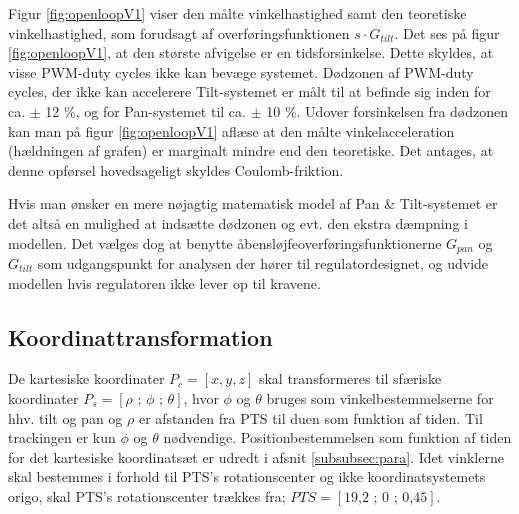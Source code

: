 Figur \ref{fig:openloopV1} viser den målte vinkelhastighed samt den teoretiske vinkelhastighed,
som forudsagt af overføringsfunktionen \(s\cdot{}G_{tilt}\).
Det ses på figur \ref{fig:openloopV1}, at den største afvigelse er en tidsforsinkelse.
Dette skyldes, at visse PWM-duty cycles ikke kan bevæge systemet.
Dødzonen af PWM-duty cycles, der ikke kan accelerere Tilt-systemet er målt til at befinde sig inden for
ca. \(\pm\) 12 \%, og for Pan-systemet til ca. \(\pm\) 10 \%.
Udover forsinkelsen fra dødzonen kan man på figur \ref{fig:openloopV1} aflæse
at den målte vinkelacceleration (hældningen af grafen) er marginalt mindre end den teoretiske.
Det antages, at denne opførsel hovedsageligt skyldes Coulomb-friktion.

Hvis man ønsker en mere nøjagtig matematisk model af Pan \& Tilt-systemet
er det altså en mulighed at indsætte dødzonen og evt. den ekstra dæmpning i modellen.
Det vælges dog at benytte åbensløjfeoverføringsfunktionerne \(G_{pan}\) og \(G_{tilt}\)
som udgangspunkt for analysen der hører til regulatordesignet,
og udvide modellen hvis regulatoren ikke lever op til kravene.

\subsection{Koordinattransformation}
\label{sec:koordinattransformation}
De kartesiske koordinater \(P_c=\left[x, y, z\right]\) skal transformeres til sfæriske koordinater \(P_s=\left[\rho \text{ ; } \phi \text{ ; } \theta\right]\), hvor \(\phi\) og \(\theta\) bruges som vinkelbestemmelserne for hhv. tilt og pan og \(\rho\) er afstanden fra PTS til duen som funktion af tiden.
Til trackingen er kun \(\phi\) og \(\theta\) nødvendige.
Positionbestemmelsen som funktion af tiden for det kartesiske koordinatsæt er udredt i afsnit \ref{subsubsec:para}.
Idet vinklerne skal bestemmes i forhold til PTS's rotationscenter og ikke koordinatsystemets origo, skal PTS's rotationscenter trækkes fra; \(PTS=[\text{19,2 ; 0 ; 0,45}]\). 

